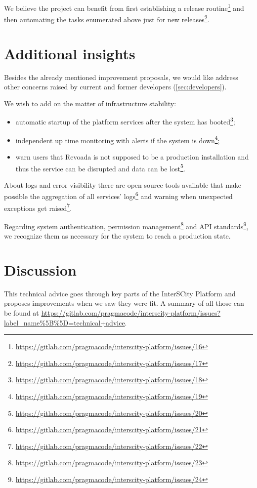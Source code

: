 \documentclass[paper=a4, fontsize=11pt]{scrartcl}
\numberwithin{equation}{section}    %
\numberwithin{figure}{section}      %
\numberwithin{table}{section}        %
\begin{document}
  We believe the project can benefit from first establishing a release routine\footnote{\url{https://gitlab.com/pragmacode/interscity-platform/issues/16}} and then automating the tasks enumerated above just for new releases\footnote{\url{https://gitlab.com/pragmacode/interscity-platform/issues/17}}.

\section{Additional insights}
\label{sec:addtinsights}
  Besides the already mentioned improvement proposals, we would like address other concerns raised by current and former developers (\ref{sec:developers}).

  We wish to add on the matter of infrastructure stability:

  \begin{itemize}
    \item automatic startup of the platform services after the system has booted\footnote{\url{https://gitlab.com/pragmacode/interscity-platform/issues/18}};
    \item independent up time monitoring with alerts if the system is down\footnote{\url{https://gitlab.com/pragmacode/interscity-platform/issues/19}};
    \item warn users that Revoada is not supposed to be a production installation and thus the service can be disrupted and data can be lost\footnote{\url{https://gitlab.com/pragmacode/interscity-platform/issues/20}}.
  \end{itemize}

  About logs and error visibility there are open source tools available that make possible the aggregation of all services' logs\footnote{\url{https://gitlab.com/pragmacode/interscity-platform/issues/21}} and warning when unexpected exceptions get raised\footnote{\url{https://gitlab.com/pragmacode/interscity-platform/issues/22}}.

  Regarding system authentication, permission management\footnote{\url{https://gitlab.com/pragmacode/interscity-platform/issues/23}} and API standards\footnote{\url{https://gitlab.com/pragmacode/interscity-platform/issues/24}}, we recognize them as necessary for the system to reach a production state.

\section{Discussion}
\label{sec:discussion}
  This technical advice goes through key parts of the InterSCity Platform and proposes improvements when we saw they were fit. A summary of all those can be found at \url{https://gitlab.com/pragmacode/interscity-platform/issues?label_name\%5B\%5D=technical+advice}.
\end{document}
